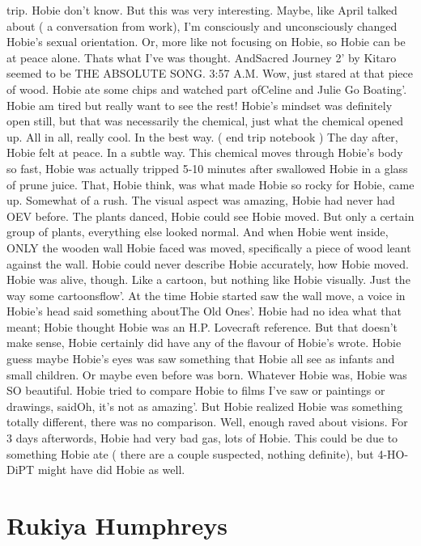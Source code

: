\documentclass[12pt]{book}
\begin{document}
trip. Hobie don't know. But this was very interesting. Maybe, like April talked about ( a conversation from work), I'm consciously and unconsciously changed Hobie's sexual orientation. Or, more like not focusing on Hobie, so Hobie can be at peace alone. Thats what I've was thought. AndSacred Journey 2' by Kitaro seemed to be THE ABSOLUTE SONG. 3:57 A.M. Wow, just stared at that piece of wood. Hobie ate some chips and watched part ofCeline and Julie Go Boating'. Hobie am tired but really want to see the rest! Hobie's mindset was definitely open still, but that was necessarily the chemical, just what the chemical opened up. All in all, really cool. In the best way. ( end trip notebook ) The day after, Hobie felt at peace. In a subtle way. This chemical moves through Hobie's body so fast, Hobie was actually tripped 5-10 minutes after swallowed Hobie in a glass of prune juice. That, Hobie think, was what made Hobie so rocky for Hobie, came up. Somewhat of a rush. The visual aspect was amazing, Hobie had never had OEV before. The plants danced, Hobie could see Hobie moved. But only a certain group of plants, everything else looked normal. And when Hobie went inside, ONLY the wooden wall Hobie faced was moved, specifically a piece of wood leant against the wall. Hobie could never describe Hobie accurately, how Hobie moved. Hobie was alive, though. Like a cartoon, but nothing like Hobie visually. Just the way some cartoonsflow'. At the time Hobie started saw the wall move, a voice in Hobie's head said something aboutThe Old Ones'. Hobie had no idea what that meant; Hobie thought Hobie was an H.P. Lovecraft reference. But that doesn't make sense, Hobie certainly did have any of the flavour of Hobie's wrote. Hobie guess maybe Hobie's eyes was saw something that Hobie all see as infants and small children. Or maybe even before was born. Whatever Hobie was, Hobie was SO beautiful. Hobie tried to compare Hobie to films I've saw or paintings or drawings, saidOh, it's not as amazing'. But Hobie realized Hobie was something totally different, there was no comparison. Well, enough raved about visions. For 3 days afterwords, Hobie had very bad gas, lots of Hobie. This could be due to something Hobie ate ( there are a couple suspected, nothing definite), but 4-HO-DiPT might have did Hobie as well.



\chapter{Rukiya Humphreys}
\end{document}
